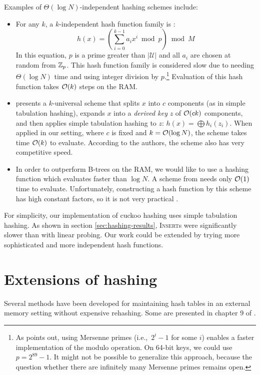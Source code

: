 Examples of $\Theta(\log N)$-independent hashing schemes include:
\begin{itemize}
\item	For any $k$, a $k$-independent hash function family is \cite{new-hash-fns}:
	$$h(x)=\left(\sum_{i=0}^{k-1} a_i x^i \bmod p\right) \bmod M$$
	In this equation, $p$ is a prime greater than $|\mathcal{U}|$
	and all $a_i$ are chosen at random from $\mathbb{Z}_p$.
	This hash function family is considered slow due to needing
	$\Theta(\log N)$ time and using integer division by $p$.\footnote{%
		As \cite{univ-classes} points out, using Mersenne primes
		(i.e.,\ $2^i-1$ for some $i$) enables a faster implementation of
		the modulo operation. On 64-bit keys, we could use $p=2^{89}-1$.
		It might not be possible to generalize this approach, because
		the question whether there are infinitely many Mersenne primes
		remains open.
	}
	Evaluation of this hash function takes $\mathcal{O}(k)$ steps on the RAM.
\item \cite{tab-based-4uni-hashing} presents a $k$-universal scheme that splits
	$x$ into $c$ components (as in simple tabulation hashing),
	expands $x$ into a \emph{derived key} $z$ of $\mathcal{O}(ck)$ components,
	and then applies simple tabulation hashing to $z$:
	$h(x)=\bigoplus h_i(z_i)$.
	When applied in our setting, where $c$ is fixed and $k=\mathcal{O}(\log N)$,
	the scheme takes time $\mathcal{O}(k)$ to evaluate.
	According to the authors, the scheme also has very competitive speed.
\item In order to outperform B-trees on the RAM, we would like to use a hashing
	function which evaluates faster than $\log N$. A scheme from
	\cite{univ-ext-random} needs only $\mathcal{O}(1)$ time to evaluate. Unfortunately,
	constructing a hash function by this scheme has high constant
	factors, so it is not very practical \cite{pagh-phd}.
\end{itemize}


For simplicity, our implementation of cuckoo hashing uses simple tabulation
hashing. As shown in section \ref{sec:hashing-results}, \textsc{Insert}s were
significantly slower than with linear probing. Our work could be extended by
trying more sophisticated and more independent hash functions.

\section{Extensions of hashing}
Several methods have been developed for maintaining hash tables in an external
memory setting without expensive rehashing. Some are presented in chapter 9
of \cite{em-ads}.

